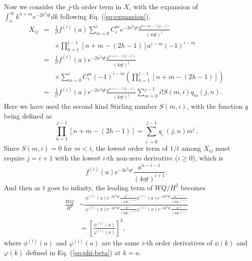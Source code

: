 \documentclass[english,aps,superscriptaddress,preprint]{revtex4-1}
\begin{document}
Now we consider the $j$-th order term in $X_{i}$ with the expansion
of $\int_{a}^{\infty}k^{n+m}e^{-2k^{2}\eta t}dk$ following Eq. (\ref{eq:expansion}),
\begin{eqnarray}
X_{ij} & = & \frac{1}{i!}f^{(i)}(a)\sum_{m=0}^{i}C_{i}^{m}e^{-2a^{2}\eta t}\frac{a^{n+m-(2j-1)}}{(4\eta t)^{j}}\nonumber \\
 &  & \times\prod_{h=1}^{j-1}\left[n+m-(2h-1)\right]a^{i-m}(-1)^{i-m}\nonumber \\
 & = & \frac{1}{i!}f^{(i)}(a)e^{-2a^{2}\eta t}\frac{a^{n+i-(2j-1)}}{(4\eta t)^{j}}\nonumber \\
 &  & \times\sum_{m=0}^{i}C_{i}^{m}(-1)^{i-m}\left(\prod_{h=1}^{j-1}\left[n+m-(2h-1)\right]\right)\nonumber \\
 & = & \frac{1}{i!}f^{(i)}(a)e^{-2a^{2}\eta t}\frac{a^{n+i-(2j-1)}}{(4\eta t)^{j}}\sum_{m=0}^{j-1}i!S(m,i)q_{m}(j,n).
\end{eqnarray}
Here we have used the second kind Stirling number $S(m,i)$, with
the function $q$ being defined as 
\begin{equation}
\prod_{h=1}^{j-1}\left[n+m-(2h-1)\right]=\sum_{i^{\prime}=0}^{j-1}q_{i^{\prime}}(j,n)m^{i^{\prime}}.
\end{equation}
Since $S(m,i)=0$ for $m<i$, the lowest order term of $1/t$ among
$X_{ij}$ must require $j=i+1$ with the lowest $i$-th non-zero derivative
($i\geq0$), which is 
\begin{equation}
f^{(i)}(a)e^{-2a^{2}\eta t}\frac{a^{n-i-1}}{(4\eta t)^{i+1}}.
\end{equation}
And then as $t$ goes to infinity, the leading term of $WQ/H^{2}$
becomes 
\begin{align}
\frac{WQ}{H^{2}} & \sim\frac{\phi^{(i)}(a)e^{-2a^{2}\eta t}\frac{a^{1-i}}{(4\eta t)^{i+1}}\phi^{(i)}(a)e^{-2a^{2}\eta t}\frac{a^{-1-i}}{(4\eta t)^{i+1}}}{\varphi^{(i)}(a)e^{-2a^{2}\eta t}\frac{a^{-i}}{(4\eta t)^{i+1}}\varphi^{(i)}(a)e^{-2a^{2}\eta t}\frac{a^{-i}}{(4\eta t)^{i+1}}}\nonumber \\
 & =\left[\frac{\phi^{(i)}(a)}{\varphi^{(i)}(a)}\right]^{2},
\end{align}
where $\phi^{(i)}(a)$ and $\varphi^{(i)}(a)$ are the same $i$-th
order derivatives of $\phi(k)$ and $\varphi(k)$ defined in Eq. (\ref{eq:phi-beta})
at $k=a$.
\end{document}
